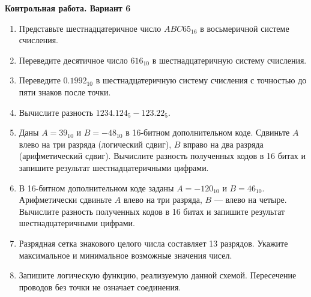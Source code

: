 \documentclass[a4paper,14pt]{extreport}
\begin{document}
\begin{center}\textbf{Контрольная работа. Вариант 6}\end{center}
\begin{enumerate}
    \item Представьте шестнадцатеричное число $ABC65_{16}$ в восьмеричной системе счисления.
    \item Переведите десятичное число $616_{10}$ в шестнадцатеричную систему счисления.
    \item Переведите $0.1992_{10}$ в шестнадцатеричную систему счисления с точностью до пяти знаков после точки.
    \item Вычислите разность $1234.124_5-123.22_5$.
    \item Даны $A=39_{10}$ и $B=-48_{10}$ в 16-битном дополнительном коде. Сдвиньте $A$ влево на три разряда (логический сдвиг), $B$ вправо на два разряда (арифметический сдвиг). Вычислите разность полученных кодов в 16 битах и запишите результат шестнадцатеричными цифрами.
    \item В 16-битном дополнительном коде заданы $A=-120_{10}$ и $B=46_{10}$. Арифметически сдвиньте $A$ влево на три разряда, $B$ --- влево на четыре. Вычислите разность полученных кодов в 16 битах и запишите результат шестнадцатеричными цифрами.
    \item Разрядная сетка знакового целого числа составляет 13 разрядов. Укажите максимальное и минимальное возможные значения чисел.
    \item Запишите логическую функцию, реализуемую данной схемой. Пересечение проводов без точки не означает соединения.
    \krShiftScheme
\end{enumerate}
\end{document}
